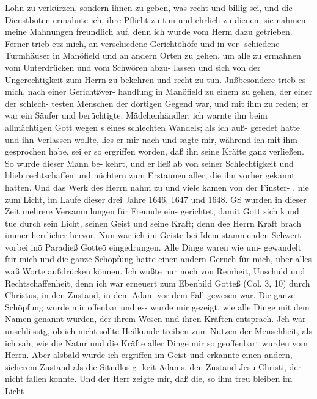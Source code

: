 
Lohn zu verkürzen, sondern ihnen zu geben, was recht und billig
sei, und die Dienstboten ermahnte ich, ihre Pflicht zu tun und
ehrlich zu dienen; sie nahmen meine Mahnungen freundlich auf,
denn ich wurde vom Herm dazu getrieben.
Ferner trieb etz mich, an verschiedene Gerichtöhöfe und in ver-
schiedene Turmhäuser in Manöfield und an andern Orten zu gehen,
um alle zu ermahnen vom Unterdrücken und vom Schwören abzu-
lassen und sich von der Ungerechtigkeit zum Herrn zu bekehren und
recht zu tun. Jnßbesondere trieb es mich, nach einer Gerichtßver-
handlung in Manöfield zu einem zu gehen, der einer der schlech-
testen Menschen der dortigen Gegend war, und mit ihm zu reden;
er war ein Säufer und berüchtigte: Mädchenhändler; ich warnte ihn
beim allmächtigen Gott wegen s eines schlechten Wandels; als ich auß-
geredet hatte und ihn Verlassen wollte, lies er mir nach und sagte
mir, während ich mit ihm gesprochen habe, sei er so ergriffen worden,
daß ihn seine Kräfte ganz verließen. So wurde dieser Mann be-
kehrt, und er ließ ab von seiner Schlechtigkeit und blieb rechtschaffen
und nüchtern zum Erstaunen aller, die ihn vorher gekannt hatten.
Und das Werk des Herrn nahm zu und viele kamen von der Finster- ,
nie zum Licht, im Laufe dieser drei Jahre 1646, 1647 und 1648.
GS wurden in dieser Zeit mehrere Versammlungen für Freunde ein-
gerichtet, damit Gott sich kund tue durch sein Licht, seinen Geist
und seine Kraft; denn dee Herrn Kraft brach immer herrlicher hervor.
Nun war ich ini Geiste bei Idem stammenden Schwert vorbei
inö Paradieß Gotteö eingedrungen. Alle Dinge waren wie um-
gewandelt ftir mich und die ganze Schöpfung hatte einen andern
Geruch für mich, über alles waß Worte außdrücken können. Ich
wußte nur noch von Reinheit, Unschuld und Rechtschaffenheit, denn
ich war erneuert zum Ebenbild Gotteß (Col. 3, 10) durch Christus,
in den Zustand, in dem Adam vor dem Fall gewesen war. Die
ganze Schöpfung wurde mir offenbar und es- wurde mir gezeigt,
wie alle Dinge mit dem Namen genannt wurden, der ihrem
Wesen und ihren Kräften entsprach. Jch war unschliisstg, ob ich
nicht sollte Heilkunde treiben zum Nutzen der Menschheit, als ich
sah, wie die Natur und die Kräfte aller Dinge mir so geoffenbart
wurden vom Herrn. Aber alsbald wurde ich ergriffen im Geist
und erkannte einen andern, sicherem Zustand als die Sitndlosig-
keit Adams, den Zustand Jesu Christi, der nicht fallen konnte.
Und der Herr zeigte mir, daß die, so ihm treu bleiben im Licht


